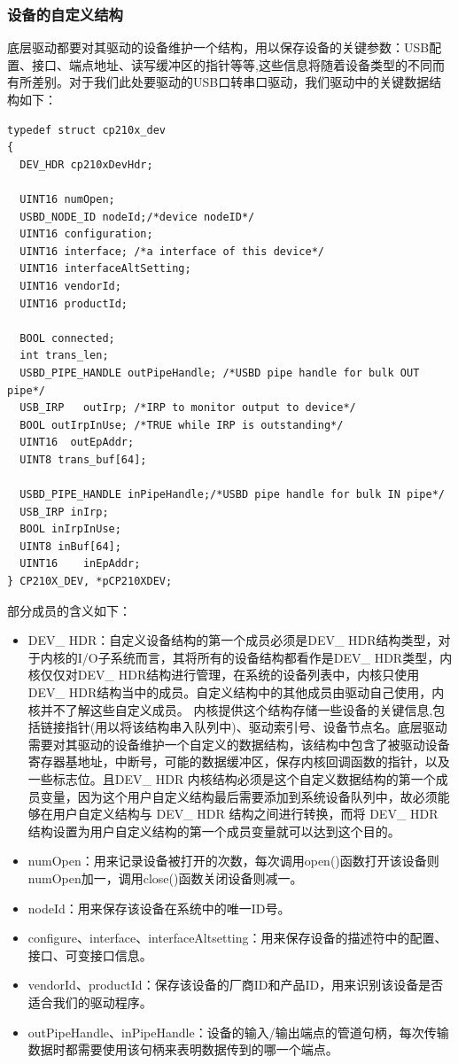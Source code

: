 \subsubsection{设备的自定义结构}
	底层驱动都要对其驱动的设备维护一个结构，用以保存设备的关键参数：USB配置、接口、端点地址、读写缓冲区的指针等等,这些信息将随着设备类型的不同而有所差别。对于我们此处要驱动的USB口转串口驱动，我们驱动中的关键数据结构如下： 
	
\lstset{language=C}
\begin{lstlisting}
typedef struct cp210x_dev
{
  DEV_HDR cp210xDevHdr;
  
  UINT16 numOpen;
  USBD_NODE_ID nodeId;/*device nodeID*/
  UINT16 configuration;	
  UINT16 interface; /*a interface of this device*/
  UINT16 interfaceAltSetting;
  UINT16 vendorId;
  UINT16 productId;

  BOOL connected;  
  int trans_len;
  USBD_PIPE_HANDLE outPipeHandle; /*USBD pipe handle for bulk OUT pipe*/
  USB_IRP	outIrp; /*IRP to monitor output to device*/
  BOOL outIrpInUse; /*TRUE while IRP is outstanding*/
  UINT16  outEpAddr;
  UINT8 trans_buf[64];

  USBD_PIPE_HANDLE inPipeHandle;/*USBD pipe handle for bulk IN pipe*/
  USB_IRP inIrp;
  BOOL inIrpInUse;
  UINT8 inBuf[64];
  UINT16 	inEpAddr;
} CP210X_DEV, *pCP210XDEV;
\end{lstlisting}
\noindent 部分成员的含义如下：

\begin{itemize}
\item DEV\_ HDR：自定义设备结构的第一个成员必须是DEV\_ HDR结构类型，对于内核的I/O子系统而言，其将所有的设备结构都看作是DEV\_ HDR类型，内核仅仅对DEV\_ HDR结构进行管理，在系统的设备列表中，内核只使用DEV\_ HDR结构当中的成员。自定义结构中的其他成员由驱动自己使用，内核并不了解这些自定义成员。
内核提供这个结构存储一些设备的关键信息,包括链接指针(用以将该结构串入队列中)、驱动索引号、设备节点名。底层驱动需要对其驱动的设备维护一个自定义的数据结构，该结构中包含了被驱动设备寄存器基地址，中断号，可能的数据缓冲区，保存内核回调函数的指针，以及一些标志位。且DEV\_ HDR 内核结构必须是这个自定义数据结构的第一个成员变量，因为这个用户自定义结构最后需要添加到系统设备队列中，故必须能够在用户自定义结构与 DEV\_ HDR 结构之间进行转换，而将 DEV\_ HDR 结构设置为用户自定义结构的第一个成员变量就可以达到这个目的。
\item numOpen：用来记录设备被打开的次数，每次调用open()函数打开该设备则numOpen加一，调用close()函数关闭设备则减一。
\item nodeId：用来保存该设备在系统中的唯一ID号。
\item configure、interface、interfaceAltsetting：用来保存设备的描述符中的配置、接口、可变接口信息。
\item vendorId、productId：保存该设备的厂商ID和产品ID，用来识别该设备是否适合我们的驱动程序。
\item outPipeHandle、inPipeHandle：设备的输入/输出端点的管道句柄，每次传输数据时都需要使用该句柄来表明数据传到的哪一个端点。
\end{itemize}






